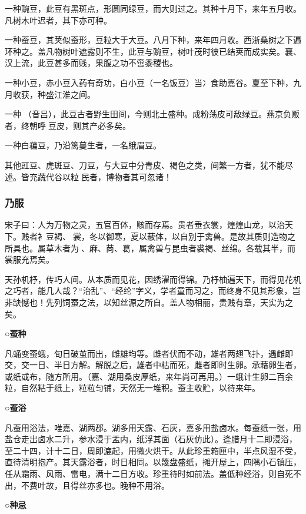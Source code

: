 \documentclass[]{article}
\begin{document}
一种豌豆，此豆有黑斑点，形圆同绿豆，而大则过之。其种十月下，来年五月收。凡树木叶迟者，其下亦可种。

一种蚕豆，其荚似蚕形，豆粒大于大豆。八月下种，来年四月收。西浙桑树之下遍环种之。盖凡物树叶遮露则不生，此豆与豌豆，树叶茂时彼已结荚而成实矣。襄、汉上流，此豆甚多而贱，果腹之功不啻黍稷也。

一种小豆，赤小豆入药有奇功，白小豆（一名饭豆）当冫食助嘉谷。夏至下种，九月收获，种盛江淮之间。

一种（音吕），此豆古者野生田间，今则北土盛种。成粉荡皮可敌绿豆。燕京负贩者，终朝呼豆皮，则其产必多矣。

一种白藊豆，乃沿篱蔓生者，一名蛾眉豆。

其他豇豆、虎斑豆、刀豆，与大豆中分青皮、褐色之类，间繁一方者，犹不能尽述。皆充蔬代谷以粒民者，博物者其可忽诸！

\hypertarget{header-n2250}{%
\subsubsection{乃服}\label{header-n2250}}

宋子曰：人为万物之灵，五官百体，赅而存焉。贵者垂衣裳，煌煌山龙，以治天下。贱者衤豆褐、裳，冬以御寒，夏以蔽体，以自别于禽兽。是故其质则造物之所具也。属草木者为、麻、苘、葛，属禽兽与昆虫者裘褐、丝绵。各载其半，而裳服充焉矣。

天孙机杼，传巧人间。从本质而见花，因绣濯而得锦。乃杼柚遍天下，而得见花机之巧者，能几人哉？``治乱''、``经纶''字义，学者童而习之，而终身不见其形象，岂非缺憾也！先列饲蚕之法，以知丝源之所自。盖人物相丽，贵贱有章，天实为之矣。

\textbf{○蚕种}

凡蛹变蚕蛾，旬日破茧而出，雌雄均等。雌者伏而不动，雄者两翅飞扑，遇雌即交，交一日、半日方解。解脱之后，雄者中枯而死，雌者即时生卵。承藉卵生者，或纸或布，随方所用。（嘉、湖用桑皮厚纸，来年尚可再用。）一蛾计生卵二百余粒，自然粘于纸上，粒粒匀铺，天然无一堆积。蚕主收贮，以待来年。

\textbf{○蚕浴}

凡蚕用浴法，唯嘉、湖两郡。湖多用天露、石灰，嘉多用盐卤水。每蚕纸一张，用盐仓走出卤水二升，参水浸于盂内，纸浮其面（石灰仿此）。逢腊月十二即浸浴，至二十四，计十二日，周即漉起，用微火烘干。从此珍重箱匣中，半点风湿不受，直待清明抱产。其天露浴者，时日相同。以篾盘盛纸，摊开屋上，四隅小石镇压，任从霜雨、风雨、雷电，满十二日方收。珍重待时如前法。盖低种经浴，则自死不出，不费叶故，且得丝亦多也。晚种不用浴。

\textbf{○种忌}
\end{document}
